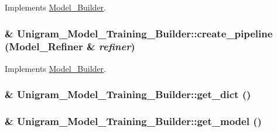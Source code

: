 Implements \hyperlink{class_model___builder_aab7de81c31d1a76e5427023b6cb95490}{Model\_\-Builder}.

\hypertarget{class_unigram___model___training___builder_a9f52dba1344442bc6455cf8b166f398c}{
\subsubsection[{create\_\-pipeline}]{ \& Unigram\_\-Model\_\-Training\_\-Builder::create\_\-pipeline ({\bf Model\_\-Refiner} \& {\em refiner})}}
\label{class_unigram___model___training___builder_a9f52dba1344442bc6455cf8b166f398c}


Implements \hyperlink{class_model___builder_a6818803bf65009076dd09dcd9bb9a0b8}{Model\_\-Builder}.

\hypertarget{class_unigram___model___training___builder_a6751bf1cff94a4173bb0e4000090161b}{
\subsubsection[{get\_\-dict}]{ \& Unigram\_\-Model\_\-Training\_\-Builder::get\_\-dict ()}}
\label{class_unigram___model___training___builder_a6751bf1cff94a4173bb0e4000090161b}
\hypertarget{class_unigram___model___training___builder_a06bbd9a4b897a0357078f3279825409d}{
\subsubsection[{get\_\-model}]{ \& Unigram\_\-Model\_\-Training\_\-Builder::get\_\-model ()}}
\label{class_unigram___model___training___builder_a06bbd9a4b897a0357078f3279825409d}


